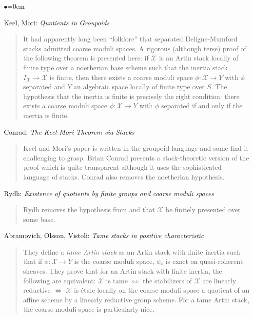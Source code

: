 \begin{list}{$\bullet$}{\leftmargin=0em}
\item Keel, Mori: \emph{Quotients in Groupoids} \cite{K-M}
\begin{quote}
It had apparently long been ``folklore'' that separated Deligne-Mumford stacks
admitted coarse moduli spaces. A rigorous (although terse) proof of the
following theorem is presented here: if $\mathcal{X}$ is an Artin stack
locally of
finite type over a noetherian base scheme such that the inertia stack
$I_\mathcal{X}
\to \mathcal{X}$ is finite, then there exists a coarse moduli space $\phi:
\mathcal{X} \to Y$
with $\phi$ separated and $Y$ an algebraic space locally of finite type over
$S$. The hypothesis that the inertia is finite is precisely the right
condition: there exists a coarse moduli space $\phi: \mathcal{X} \to Y$ with
$\phi$
separated if and only if the inertia is finite.
\end{quote}
\smallskip
\item Conrad: \emph{The Keel-Mori Theorem via Stacks} \cite{conrad}
\begin{quote}
Keel and Mori's paper \cite{K-M} is written in the groupoid language and
some find it challenging to grasp. Brian Conrad presents a stack-theoretic
version of the proof which is quite transparent although it uses the
sophisticated language of stacks. Conrad also removes the noetherian
hypothesis.
\end{quote}
\smallskip
\item Rydh: \emph{Existence of quotients by finite groups and coarse moduli
spaces} \cite{rydh_quotients}
\begin{quote}
Rydh removes the hypothesis from \cite{K-M} and \cite{conrad} that
$\mathcal{X}$
be finitely presented over some base.
\end{quote}
\smallskip
\item
Abramovich, Olsson, Vistoli: \emph{Tame stacks in positive characteristic}
\cite{tame}
\begin{quote}
They define a \emph{tame Artin stack} as an Artin stack with finite inertia
such that if $\phi: \mathcal{X} \to Y$ is the coarse moduli space, $\phi_*$ is
exact
on quasi-coherent sheaves. They prove that for an Artin stack with finite
inertia, the following are equivalent: $\mathcal{X}$ is tame $\iff$ the
stabilizers of
$\mathcal{X}$ are linearly reductive $\iff$ $\mathcal{X}$ is \'etale locally on
the coarse
moduli space a quotient of an affine scheme by a linearly reductive group
scheme. For a tame Artin stack, the coarse moduli space is particularly nice.

\end{quote}
\end{list}

